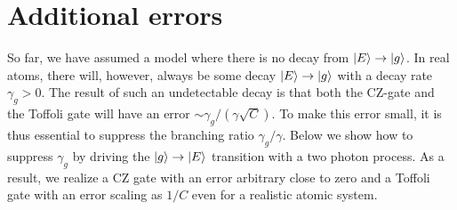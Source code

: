 \section{Additional errors}

So far, we have assumed a model where there is no decay from
$| E \rangle\to| g \rangle$. In real atoms, there will, however, always be some decay
$| E \rangle\to| g \rangle$ with a decay rate $\gamma_{g}>0$. The result of such an
undetectable decay is that both the CZ-gate and the Toffoli gate will have an
error $\sim \gamma_{g}/(\gamma\sqrt{C})$. To make this error small, it is thus essential to suppress the
branching ratio $\gamma_{g}/\gamma$. Below we show how to suppress $\gamma_{g}$ by driving the $| g \rangle\to| E \rangle$
transition with a two photon process. As a result, we realize a CZ gate with an
error arbitrary close to zero and a Toffoli gate with an error scaling  as $1/C$
even for a realistic atomic system.

